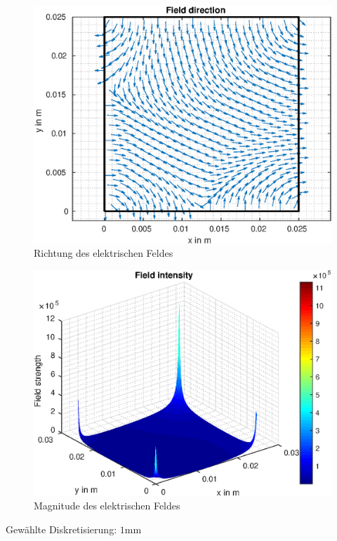 \begin{figure}[H]
	\centering
	\includegraphics[scale=1]{pics/Bsp_1_c/fig_3.eps}
	\caption{Richtung des elektrischen Feldes}
\end{figure}

\begin{figure}[H]
	\centering
	\includegraphics[scale=1]{pics/Bsp_1_c/fig_4.eps}
	\caption{Magnitude des elektrischen Feldes}
	\label{fig:mag_E_3}
\end{figure}

\newpage
{}

Gewählte Diskretisierung: $1\si{\milli\meter}$\newline

